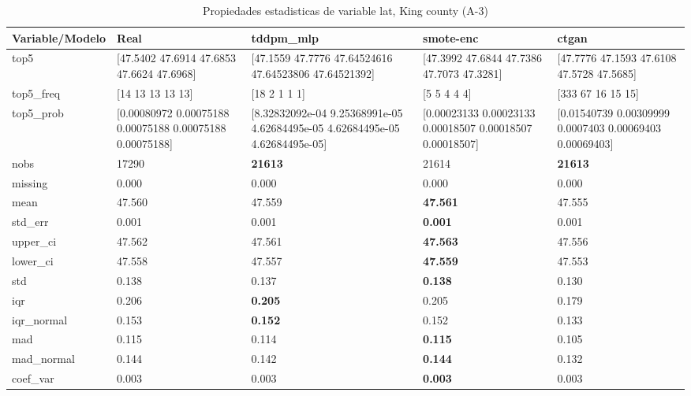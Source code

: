 \begin{table}[H]
\centering
\fontsize{8}{14}\selectfont
\caption{Propiedades  estadisticas de variable lat, King county (A-3)}
\label{table-stats-king county-a-3-lat}
\begin{tabular}{|l|m{10em}|m{10em}|m{10em}|m{10em}|}
\hline
 \rowcolor[gray]{0.8}
Variable/Modelo & Real & tddpm\_mlp & smote-enc & ctgan \\
\hline top5 & [47.5402 47.6914 47.6853 47.6624 47.6968] & [47.1559     47.7776     47.64524616 47.64523806 47.64521392] & [47.3992 47.6844 47.7386 47.7073 47.3281] & [47.7776 47.1593 47.6108 47.5728 47.5685] \\
\hline top5\_freq & [14 13 13 13 13] & [18  2  1  1  1] & [5 5 4 4 4] & [333  67  16  15  15] \\
\hline top5\_prob & [0.00080972 0.00075188 0.00075188 0.00075188 0.00075188] & [8.32832092e-04 9.25368991e-05 4.62684495e-05 4.62684495e-05
 4.62684495e-05] & [0.00023133 0.00023133 0.00018507 0.00018507 0.00018507] & [0.01540739 0.00309999 0.0007403  0.00069403 0.00069403] \\
\hline nobs & 17290 & \bfseries 21613 & \cellcolor[rgb]{0.9, 0.54, 0.52} 21614 & \bfseries 21613 \\
\hline missing & 0.000 & 0.000 & 0.000 & 0.000 \\
\hline mean & 47.560 & 47.559 & \bfseries 47.561 & \cellcolor[rgb]{0.9, 0.54, 0.52} 47.555 \\
\hline std\_err & 0.001 & 0.001 & \bfseries 0.001 & \cellcolor[rgb]{0.9, 0.54, 0.52} 0.001 \\
\hline upper\_ci & 47.562 & 47.561 & \bfseries 47.563 & \cellcolor[rgb]{0.9, 0.54, 0.52} 47.556 \\
\hline lower\_ci & 47.558 & 47.557 & \bfseries 47.559 & \cellcolor[rgb]{0.9, 0.54, 0.52} 47.553 \\
\hline std & 0.138 & 0.137 & \bfseries 0.138 & \cellcolor[rgb]{0.9, 0.54, 0.52} 0.130 \\
\hline iqr & 0.206 & \bfseries 0.205 & 0.205 & \cellcolor[rgb]{0.9, 0.54, 0.52} 0.179 \\
\hline iqr\_normal & 0.153 & \bfseries 0.152 & 0.152 & \cellcolor[rgb]{0.9, 0.54, 0.52} 0.133 \\
\hline mad & 0.115 & 0.114 & \bfseries 0.115 & \cellcolor[rgb]{0.9, 0.54, 0.52} 0.105 \\
\hline mad\_normal & 0.144 & 0.142 & \bfseries 0.144 & \cellcolor[rgb]{0.9, 0.54, 0.52} 0.132 \\
\hline coef\_var & 0.003 & 0.003 & \bfseries 0.003 & \cellcolor[rgb]{0.9, 0.54, 0.52} 0.003 \\

\end{tabular}
\end{table}
